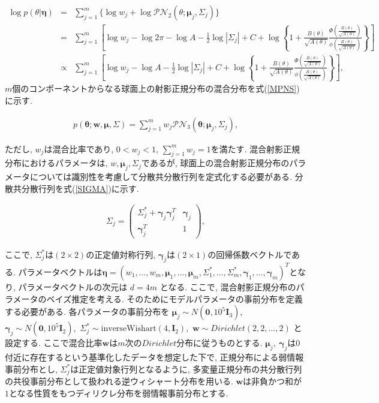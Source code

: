 \documentclass[a4j,12pt]{jarticle}
\begin{document}
\footnotesize
\begin{eqnarray}
\label{logPNC}
\log p(\theta | \bm \eta) &=& \sum^m_{j=1} \{\log w_j + \log \mathcal{PN}_2(\theta;\bm \mu_j, \Sigma_j)\} \nonumber \\ 
&=& \sum^m_{j=1} \left[ \log w_j - \log 2\pi - \log A - \frac{1}{2} \log |\Sigma_j| + C + \log \left\{1 + \frac{B(\theta)}{\sqrt{A(\theta)}} \frac{\Phi \left(\frac{B(\theta)}{\sqrt{A(\theta)}}\right)}{\phi \left(\frac{B(\theta)}{\sqrt{A(\theta)}}\right)}\right\} \right] \nonumber \\
&\propto& \sum^m_{j=1} \left[ \log w_j - \log A - \frac{1}{2} \log |\Sigma_j| + C + \log \left\{1 + \frac{B(\theta)}{\sqrt{A(\theta)}} \frac{\Phi \left(\frac{B(\theta)}{\sqrt{A(\theta)}}\right)}{\phi \left(\frac{B(\theta)}{\sqrt{A(\theta)}}\right)}\right\} \right], 
\end{eqnarray}
\normalsize
\fi
$m$個のコンポーネントからなる球面上の射影正規分布の混合分布を式(\ref{MPNS})に示す. 

\vspace{-2zh}
\begin{eqnarray}
\label{MPNS}
p(\bm \theta;\bm w,\bm \mu, \Sigma) = \sum^m_{j=1} w_j \mathcal{PN}_3(\bm \theta;\bm \mu_j, \Sigma_j),
\end{eqnarray}

\noindent
ただし, $w_j$は混合比率であり, $0 < w_j < 1$, $\sum^m_{j=1} w_j = 1$を満たす. 混合射影正規分布におけるパラメータは, $w, \bm \mu_j, \Sigma_j$であるが, 球面上の混合射影正規分布のパラメータについては識別性を考慮して分散共分散行列を定式化する必要がある. 分散共分散行列を式(\ref{SIGMA})に示す.

\begin{eqnarray}
\label{SIGMA}
 \Sigma_j = \left(
    \begin{array}{cc}
      \Sigma^*_j + \bm \gamma_j \bm \gamma_j^T & \bm \gamma_j \\
      \bm \gamma_j^T & 1
    \end{array}
  \right),
\end{eqnarray}

\noindent
ここで, $\Sigma^*_j$は$(2 \times 2)$の正定値対称行列, $\bm \gamma_j$は$(2 \times 1)$の回帰係数ベクトルである. パラメータベクトルは$\bm \eta = (w_1, \dots, w_m, \bm \mu_1, \dots, \bm \mu_m, \Sigma^*_1, \dots, \Sigma^*_m, \bm \gamma_1, \dots, \bm \gamma_m)^T$となり, パラメータベクトルの次元は $d = 4m$ となる. ここで, 混合射影正規分布のパラメータのベイズ推定を考える. そのためにモデルパラメータの事前分布を定義する必要がある. 各パラメータの事前分布を $\bm \mu_j \sim N(\bm 0, 10^5 \bm I_3)$,\ $\bm \gamma_j \sim  N(\bm 0, 10^5 \bm I_2)$,\ $\Sigma^*_j \sim \mathrm{inverse Wishart}(4,\bm I_2)$,\ $\bm w \sim Dirichlet(2,2, \dots, 2)$ と設定する. ここで混合比率$\bm w$は$m$次の$Dirichlet$分布に従うものとする. $\bm \mu_j,\ \bm \gamma_j$は$0$付近に存在するという基準化したデータを想定した下で, 正規分布による弱情報事前分布とし, $\Sigma^*_j$は正定値対象行列となるように, 多変量正規分布の共分散行列の共役事前分布として扱われる逆ウィシャート分布を用いる. $\bm w$は非負かつ和が $1$となる性質をもつディリクレ分布を弱情報事前分布とする.
\end{document}
